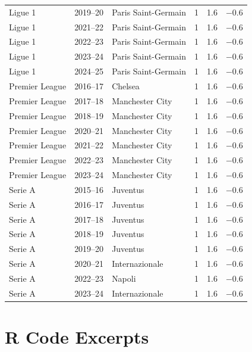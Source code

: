 \documentclass[11pt, a4paper]{article}
\begin{document}
\begin{longtable}{l l l c r r}
  Ligue 1        & 2019--20 & Paris Saint-Germain      &  1 &  1.6 & $-0.6$ \\
  Ligue 1        & 2021--22 & Paris Saint-Germain      &  1 &  1.6 & $-0.6$ \\
  Ligue 1        & 2022--23 & Paris Saint-Germain      &  1 &  1.6 & $-0.6$ \\
  Ligue 1        & 2023--24 & Paris Saint-Germain      &  1 &  1.6 & $-0.6$ \\
  Ligue 1        & 2024--25 & Paris Saint-Germain      &  1 &  1.6 & $-0.6$ \\
  Premier League & 2016--17 & Chelsea                  &  1 &  1.6 & $-0.6$ \\
  Premier League & 2017--18 & Manchester City          &  1 &  1.6 & $-0.6$ \\
  Premier League & 2018--19 & Manchester City          &  1 &  1.6 & $-0.6$ \\
  Premier League & 2020--21 & Manchester City          &  1 &  1.6 & $-0.6$ \\
  Premier League & 2021--22 & Manchester City          &  1 &  1.6 & $-0.6$ \\
  Premier League & 2022--23 & Manchester City          &  1 &  1.6 & $-0.6$ \\
  Premier League & 2023--24 & Manchester City          &  1 &  1.6 & $-0.6$ \\
  Serie A        & 2015--16 & Juventus                 &  1 &  1.6 & $-0.6$ \\
  Serie A        & 2016--17 & Juventus                 &  1 &  1.6 & $-0.6$ \\
  Serie A        & 2017--18 & Juventus                 &  1 &  1.6 & $-0.6$ \\
  Serie A        & 2018--19 & Juventus                 &  1 &  1.6 & $-0.6$ \\
  Serie A        & 2019--20 & Juventus                 &  1 &  1.6 & $-0.6$ \\
  Serie A        & 2020--21 & Internazionale           &  1 &  1.6 & $-0.6$ \\
  Serie A        & 2022--23 & Napoli                   &  1 &  1.6 & $-0.6$ \\
  Serie A        & 2023--24 & Internazionale           &  1 &  1.6 & $-0.6$ \\
\end{longtable}

\section{R Code Excerpts}
\label{app:code}
\end{document}
